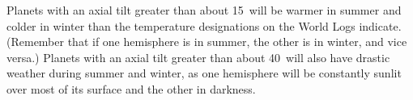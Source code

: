 Planets with an axial tilt greater than about 15\textdegree\ will be
warmer in summer and colder in winter than the temperature
designations on the World Logs indicate.  (Remember that if one
hemisphere is in summer, the other is in winter, and vice versa.)
Planets with an axial tilt greater than about 40\textdegree\ will also
have drastic weather during summer and winter, as one hemisphere will
be constantly sunlit over most of its surface and the other in
darkness.

\begin{table}[htbp]
  \caption{World Axial Tilt Table}
  \centering
\end{table}

